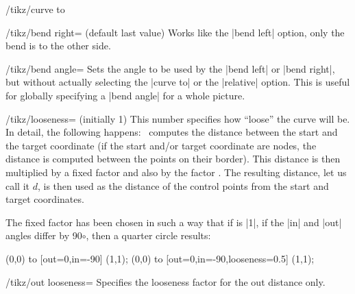 \begin{key}{/tikz/curve to}
  \begin{key}{/tikz/bend right= (default \normalfont last  value)}
    Works like the |bend left| option, only the bend is to the other side.
  \end{key}

  \begin{key}{/tikz/bend angle=}
    Sets the angle to be used by the |bend left| or |bend right|, but
    without actually selecting the |curve to| or the |relative|
    option. This is useful for globally specifying a |bend angle| for a
    whole picture.
  \end{key}

  \begin{key}{/tikz/looseness= (initially 1)}
    This number specifies how ``loose'' the curve will be. In detail,
    the following happens: \tikzname\ computes the distance between the
    start and the target coordinate (if the start and/or target
    coordinate are nodes, the distance is computed between the points on
    their border). This distance is then multiplied by a fixed factor
    and also by the factor . The resulting distance, let us
    call it $d$, is then used as the distance of the control points from
    the start and target coordinates.

    The fixed factor has been chosen in such a way that if 
    is |1|, if the |in| and |out| angles differ by
    90$\circ$, then a quarter circle results:
  \begin{codeexample}[]
\tikz \draw (0,0) to [out=0,in=-90]               (1,1);
\tikz \draw (0,0) to [out=0,in=-90,looseness=0.5] (1,1);
  \end{codeexample}
  \end{key}

  \begin{key}{/tikz/out looseness=}
    Specifies the looseness factor for the out distance only.
  \end{key}


\end{key}
